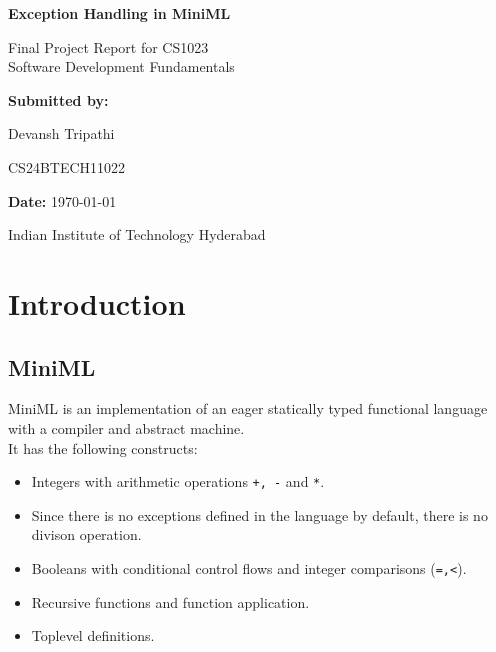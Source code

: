 \documentclass{article}
\begin{document}
\begin{titlepage}
    \centering
    \vspace*{2cm}

    {\huge \bfseries Exception Handling in MiniML \par}
    \vspace{0.5cm}

    {\Large Final Project Report for CS1023\\Software Development Fundamentals \par}
    \vspace{1.5cm}

    {\Large \textbf{Submitted by:} \par} 
    \vspace{0.3cm}
    {\large Devansh Tripathi \par} 
    {\large CS24BTECH11022 \par} 
    \vspace{2cm}

    {\large \textbf{Date:} \today \par} 

    \vfill
    {\large Indian Institute of Technology Hyderabad \par}
\end{titlepage}

\newpage
\section{Introduction}
    \subsection{MiniML}
        MiniML is an implementation of an eager statically typed functional language
        with a compiler and abstract machine.\\
        It has the following constructs:
        \begin{itemize}
        \item Integers with arithmetic operations \texttt{+, -} and \texttt{*}.
        \item Since there is no exceptions defined in the language by default, there is no divison operation.
        \item Booleans with conditional control flows and integer comparisons (\texttt{=,<}).
        \item Recursive functions and function application.
        \item Toplevel definitions.
        \end{itemize}
    
\end{document}
